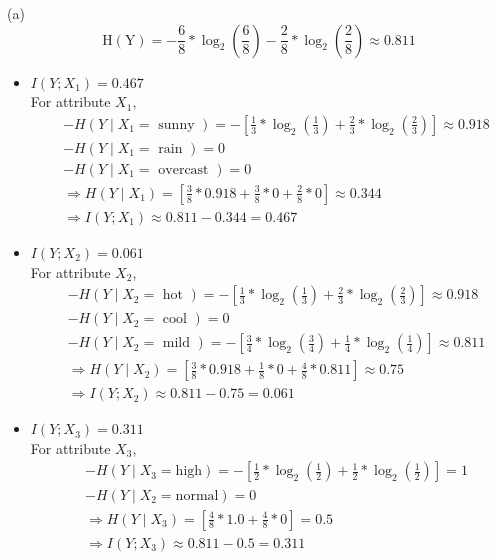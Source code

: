 \solution

(a) $$\mathrm{H}(\mathrm{Y})=-\frac{6}{8} * \log _{2}\left(\frac{6}{8}\right)-\frac{2}{8} * \log _{2}\left(\frac{2}{8}\right) \approx 0.811 $$
\begin{itemize}
    \item $I\left(Y ; X_{1}\right)=0.467$ \\
    For attribute $X_{1}$,
    \begin{align*}
    & -H\left(Y \mid X_{1}=\text { sunny }\right)=-\left[\frac{1}{3} * \log _{2}\left(\frac{1}{3}\right)+\frac{2}{3} * \log _{2}\left(\frac{2}{3}\right)\right] \approx 0.918 \\
    & -H\left(Y \mid X_{1}=\text { rain }\right)=0 \\
    & -H\left(Y \mid X_{1}=\text { overcast }\right)=0 \\
    & \Rightarrow H\left(Y \mid X_{1}\right)=\left[\frac{3}{8} * 0.918+\frac{3}{8} * 0+\frac{2}{8} * 0\right] \approx 0.344 \\
    & \Rightarrow I\left(Y ; X_{1}\right) \approx 0.811-0.344=0.467
    \end{align*}

    \item $I\left(Y ; X_{2}\right)=0.061$\\
    For attribute $X_{2}$,
    \begin{align*}
    & -H\left(Y \mid X_{2}=\text { hot }\right)=-\left[\frac{1}{3} * \log _{2}\left(\frac{1}{3}\right)+\frac{2}{3} * \log _{2}\left(\frac{2}{3}\right)\right] \approx 0.918 \\
    & -H\left(Y \mid X_{2}=\text { cool }\right)=0 \\
    & -H\left(Y \mid X_{2}=\text { mild }\right)=-\left[\frac{3}{4} * \log _{2}\left(\frac{3}{4}\right)+\frac{1}{4} * \log _{2}\left(\frac{1}{4}\right)\right] \approx 0.811 \\
    & \Rightarrow H\left(Y \mid X_{2}\right)=\left[\frac{3}{8} * 0.918+\frac{1}{8} * 0+\frac{4}{8} * 0.811\right] \approx 0.75 \\
    & \Rightarrow I\left(Y ; X_{2}\right) \approx 0.811-0.75=0.061
    \end{align*}
    \item $I\left(Y ; X_{3}\right)=0.311$\\
    For attribute $X_{3}$,\\
    \begin{align*}
    & -H\left(Y \mid X_{3}=\text{high}\right)=-\left[\frac{1}{2} * \log _{2}\left(\frac{1}{2}\right)+\frac{1}{2} * \log _{2}\left(\frac{1}{2}\right)\right]=1\\
    & -H\left(Y \mid X_{2}=\text{normal}\right)=0\\
    & \Rightarrow H\left(Y \mid X_{3}\right)=\left[\frac{4}{8} * 1.0+\frac{4}{8} * 0\right]=0.5\\
    & \Rightarrow I\left(Y ; X_{3}\right) \approx 0.811-0.5=0.311
    \end{align*}


\end{itemize}
